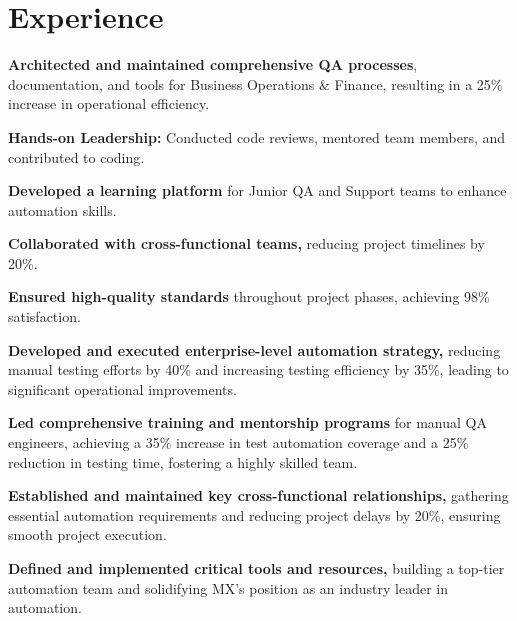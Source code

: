 \documentclass[hmargin=1.25cm,vmargin=0.75cm,scale=0.9]{deedy-resume-openfont}
\begin{document}
\begin{minipage}[t]{0.66\textwidth} 

\section{Experience}

\begin{tightemize}
\item \textbf{Architected and maintained comprehensive QA processes}, documentation, and tools for Business Operations \& Finance, resulting in a 25\% increase in operational efficiency.
\item \textbf{Hands-on Leadership:} Conducted code reviews, mentored team members, and contributed to coding.
\item \textbf{Developed a learning platform} for Junior QA and Support teams to enhance automation skills.
\item \textbf{Collaborated with cross-functional teams,} reducing project timelines by 20\%.
\item \textbf{Ensured high-quality standards} throughout project phases, achieving 98\% satisfaction.
\end{tightemize}

\begin{tightemize}
\item \textbf{Developed and executed enterprise-level automation strategy,} reducing manual testing efforts by 40\% and increasing testing efficiency by 35\%, leading to significant operational improvements.
\item \textbf{Led comprehensive training and mentorship programs} for manual QA engineers, achieving a 35\% increase in test automation coverage and a 25\% reduction in testing time, fostering a highly skilled team.
\item \textbf{Established and maintained key cross-functional relationships,} gathering essential automation requirements and reducing project delays by 20\%, ensuring smooth project execution.
\item \textbf{Defined and implemented critical tools and resources,} building a top-tier automation team and solidifying MX's position as an industry leader in automation.
\end{tightemize}


\end{minipage}
\end{document}
